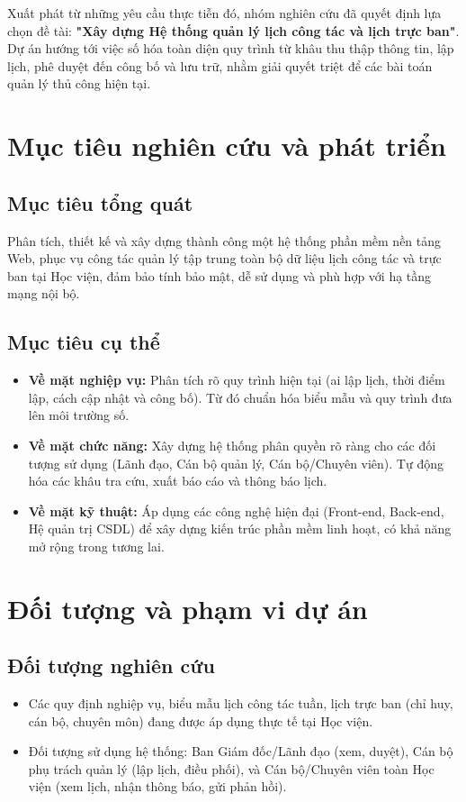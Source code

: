 \documentclass[18pt,a4paper]{report}
\begin{document}
Xuất phát từ những yêu cầu thực tiễn đó, nhóm nghiên cứu đã quyết định lựa chọn đề tài: \textbf{"Xây dựng Hệ thống quản lý lịch công tác và lịch trực ban"}. Dự án hướng tới việc số hóa toàn diện quy trình từ khâu thu thập thông tin, lập lịch, phê duyệt đến công bố và lưu trữ, nhằm giải quyết triệt để các bài toán quản lý thủ công hiện tại.

\section{Mục tiêu nghiên cứu và phát triển}
\subsection{Mục tiêu tổng quát}
Phân tích, thiết kế và xây dựng thành công một hệ thống phần mềm nền tảng Web, phục vụ công tác quản lý tập trung toàn bộ dữ liệu lịch công tác và trực ban tại Học viện, đảm bảo tính bảo mật, dễ sử dụng và phù hợp với hạ tầng mạng nội bộ.

\subsection{Mục tiêu cụ thể}
\begin{itemize}[leftmargin=1.2cm]
    \item \textbf{Về mặt nghiệp vụ:} Phân tích rõ quy trình hiện tại (ai lập lịch, thời điểm lập, cách cập nhật và công bố). Từ đó chuẩn hóa biểu mẫu và quy trình đưa lên môi trường số.
    \item \textbf{Về mặt chức năng:} Xây dựng hệ thống phân quyền rõ ràng cho các đối tượng sử dụng (Lãnh đạo, Cán bộ quản lý, Cán bộ/Chuyên viên). Tự động hóa các khâu tra cứu, xuất báo cáo và thông báo lịch.
    \item \textbf{Về mặt kỹ thuật:} Áp dụng các công nghệ hiện đại (Front-end, Back-end, Hệ quản trị CSDL) để xây dựng kiến trúc phần mềm linh hoạt, có khả năng mở rộng trong tương lai.
\end{itemize}

\section{Đối tượng và phạm vi dự án}
\subsection{Đối tượng nghiên cứu}
\begin{itemize}[leftmargin=1.2cm]
    \item Các quy định nghiệp vụ, biểu mẫu lịch công tác tuần, lịch trực ban (chỉ huy, cán bộ, chuyên môn) đang được áp dụng thực tế tại Học viện.
    \item Đối tượng sử dụng hệ thống: Ban Giám đốc/Lãnh đạo (xem, duyệt), Cán bộ phụ trách quản lý (lập lịch, điều phối), và Cán bộ/Chuyên viên toàn Học viện (xem lịch, nhận thông báo, gửi phản hồi).
\end{itemize}
\end{document}
